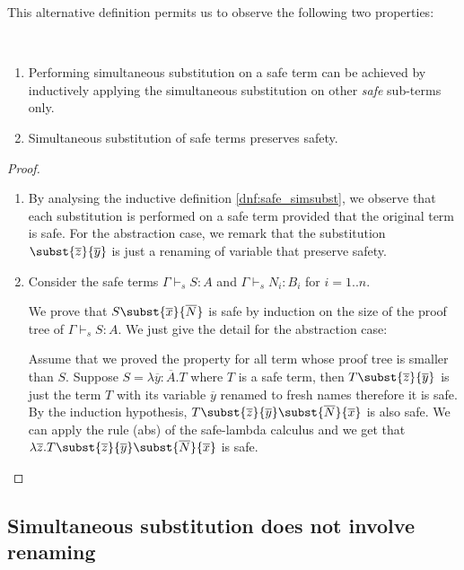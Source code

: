 \documentclass{article}
\begin{document}
This alternative definition permits us to observe the following two
properties:

\begin{property}
\label{prop:subst_preserve_safety} \
\begin{enumerate}
\item Performing simultaneous substitution on a safe term can be
achieved by inductively applying the simultaneous substitution on
other \emph{safe} sub-terms only.

\item Simultaneous substitution of safe terms preserves safety.
\end{enumerate}
\end{property}

\begin{proof}
\begin{enumerate}
\item By analysing the inductive definition \ref{dnf:safe_simsubst}, we
observe that each substitution is performed on a safe term provided
that the original term is safe. For the abstraction case, we remark
that the substitution $\subst{\overline{z}}{\overline{y}}$ is just a
renaming of variable that preserve safety.

\item Consider the safe terms $\Gamma \vdash_s S : A$ and  $\Gamma \vdash_s N_i : B_i$ for $i = 1..n$.

We prove that $S \subst{\overline{x}}{\overline{N}}$ is safe by
induction on the size of the proof tree of $\Gamma \vdash_s S : A$.
We just give the detail for the abstraction case:

Assume that we proved the property for all term whose proof tree is
smaller than $S$. Suppose $S = \lambda \overline{y} : \overline{A}.
T$ where $T$ is a safe term, then $T
\subst{\overline{z}}{\overline{y}}$ is just the term $T$ with its
variable $\overline{y}$ renamed to fresh names therefore it is safe.
By the induction hypothesis,
$T\subst{\overline{z}}{\overline{y}}\subst{\overline{N}}{\overline{x}}$
is also safe. We can apply the rule (abs) of the safe-lambda
calculus and we get that $\lambda \overline{z} . T
\subst{\overline{z}}{\overline{y}}
\subst{\overline{N}}{\overline{x}}$ is safe.
\end{enumerate}
\end{proof}


\subsection{Simultaneous substitution does not involve renaming}
\end{document}
